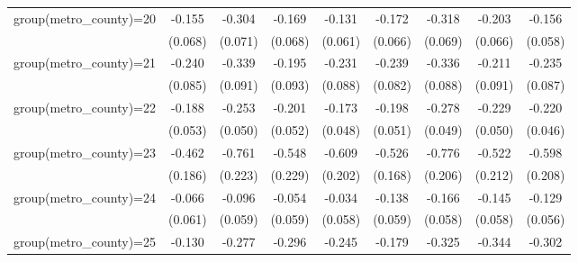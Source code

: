 {\begin{tabular}{l*{8}{c}}
group(metro\_county)=20&      -0.155\sym{**} &      -0.304\sym{***}&      -0.169\sym{**} &      -0.131\sym{**} &      -0.172\sym{**} &      -0.318\sym{***}&      -0.203\sym{***}&      -0.156\sym{**} \\
                    &     (0.068)         &     (0.071)         &     (0.068)         &     (0.061)         &     (0.066)         &     (0.069)         &     (0.066)         &     (0.058)         \\
group(metro\_county)=21&      -0.240\sym{***}&      -0.339\sym{***}&      -0.195\sym{**} &      -0.231\sym{**} &      -0.239\sym{***}&      -0.336\sym{***}&      -0.211\sym{**} &      -0.235\sym{**} \\
                    &     (0.085)         &     (0.091)         &     (0.093)         &     (0.088)         &     (0.082)         &     (0.088)         &     (0.091)         &     (0.087)         \\
group(metro\_county)=22&      -0.188\sym{***}&      -0.253\sym{***}&      -0.201\sym{***}&      -0.173\sym{***}&      -0.198\sym{***}&      -0.278\sym{***}&      -0.229\sym{***}&      -0.220\sym{***}\\
                    &     (0.053)         &     (0.050)         &     (0.052)         &     (0.048)         &     (0.051)         &     (0.049)         &     (0.050)         &     (0.046)         \\
group(metro\_county)=23&      -0.462\sym{**} &      -0.761\sym{***}&      -0.548\sym{**} &      -0.609\sym{***}&      -0.526\sym{***}&      -0.776\sym{***}&      -0.522\sym{**} &      -0.598\sym{***}\\
                    &     (0.186)         &     (0.223)         &     (0.229)         &     (0.202)         &     (0.168)         &     (0.206)         &     (0.212)         &     (0.208)         \\
group(metro\_county)=24&      -0.066         &      -0.096         &      -0.054         &      -0.034         &      -0.138\sym{**} &      -0.166\sym{***}&      -0.145\sym{**} &      -0.129\sym{**} \\
                    &     (0.061)         &     (0.059)         &     (0.059)         &     (0.058)         &     (0.059)         &     (0.058)         &     (0.058)         &     (0.056)         \\
group(metro\_county)=25&      -0.130\sym{*}  &      -0.277\sym{***}&      -0.296\sym{***}&      -0.245\sym{***}&      -0.179\sym{**} &      -0.325\sym{***}&      -0.344\sym{***}&      -0.302\sym{***}\\

\end{tabular}}

